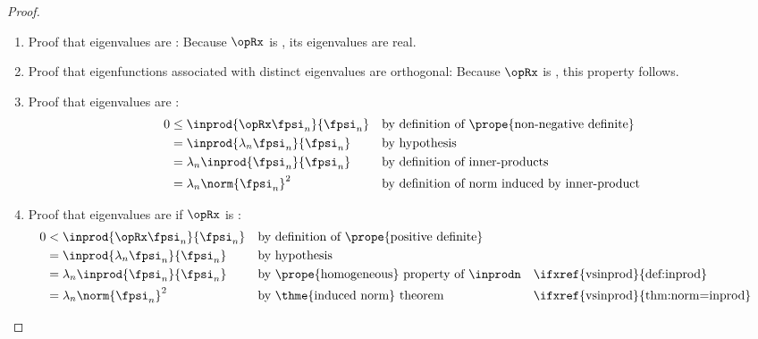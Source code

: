 \begin{proof}
\begin{enumerate}
\item Proof that eigenvalues are :
Because $\opRx$ is , its eigenvalues are real.

\item Proof that eigenfunctions associated with distinct eigenvalues are orthogonal:
Because $\opRx$ is , this property follows.

\item Proof that eigenvalues are :
      \begin{align*}
         0 &\le \inprod{\opRx \fpsi_n}{\fpsi_n}
           &&   \text{by definition of \prope{non-negative definite}}
         \\&=   \inprod{\lambda_n \fpsi_n}{\fpsi_n}
           &&   \text{by hypothesis}
         \\&=   \lambda_n \inprod{\fpsi_n}{\fpsi_n}
           &&   \text{by definition of inner-products}
         \\&=   \lambda_n \norm{\fpsi_n}^2
           &&   \text{by definition of norm induced by inner-product}
      \end{align*}

\item Proof that eigenvalues are  if $\opRx$ is :
      \begin{align*}
         0 &< \inprod{\opRx \fpsi_n}{\fpsi_n}
           && \text{by definition of \prope{positive definite}}
         \\&= \inprod{\lambda_n \fpsi_n}{\fpsi_n}
           && \text{by hypothesis}
         \\&= \lambda_n \inprod{\fpsi_n}{\fpsi_n}
           && \text{by \prope{homogeneous} property of $\inprodn$}
           && \text{\ifxref{vsinprod}{def:inprod}}
         \\&= \lambda_n \norm{\fpsi_n}^2
           && \text{by \thme{induced norm} theorem}
           && \text{\ifxref{vsinprod}{thm:norm=inprod}}
      \end{align*}
\end{enumerate}
\end{proof}

